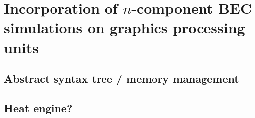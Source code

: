 
\chapter{Incorporation of $n$-component BEC simulations on graphics processing units} \label{ch-multicomp}

\section{Abstract syntax tree / memory management}
\section{Heat engine?}
